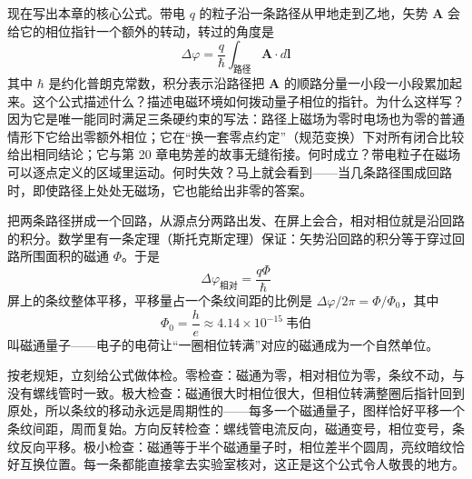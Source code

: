 \begin{mainline}
现在写出本章的核心公式。带电 \(q\) 的粒子沿一条路径从甲地走到乙地，矢势 \(\mathbf A\) 会给它的相位指针一个额外的转动，转过的角度是
\[
\Delta\varphi=\frac{q}{\hbar}\int_{\text{路径}}\mathbf A\cdot d\mathbf l
\]
其中 \(\hbar\) 是约化普朗克常数，积分表示沿路径把 \(\mathbf A\) 的顺路分量一小段一小段累加起来。这个公式描述什么？描述电磁环境如何拨动量子相位的指针。为什么这样写？因为它是唯一能同时满足三条硬约束的写法：路径上磁场为零时电场也为零的普通情形下它给出零额外相位；它在“换一套零点约定”（规范变换）下对所有闭合比较给出相同结论；它与第 20 章电势差的故事无缝衔接。何时成立？带电粒子在磁场可以逐点定义的区域里运动。何时失效？马上就会看到——当几条路径围成回路时，即使路径上处处无磁场，它也能给出非零的答案。

把两条路径拼成一个回路，从源点分两路出发、在屏上会合，相对相位就是沿回路的积分。数学里有一条定理（斯托克斯定理）保证：矢势沿回路的积分等于穿过回路所围面积的磁通 \(\Phi\)。于是
\[
\Delta\varphi_{\text{相对}}=\frac{q\Phi}{\hbar}
\]
屏上的条纹整体平移，平移量占一个条纹间距的比例是 \(\Delta\varphi/2\pi=\Phi/\Phi_0\)，其中
\[
\Phi_0=\frac{h}{e}\approx4.14\times10^{-15}\ \text{韦伯}
\]
叫磁通量子——电子的电荷让“一圈相位转满”对应的磁通成为一个自然单位。

按老规矩，立刻给公式做体检。零检查：磁通为零，相对相位为零，条纹不动，与没有螺线管时一致。极大检查：磁通很大时相位很大，但相位转满整圈后指针回到原处，所以条纹的移动永远是周期性的——每多一个磁通量子，图样恰好平移一个条纹间距，周而复始。方向反转检查：螺线管电流反向，磁通变号，相位变号，条纹反向平移。极小检查：磁通等于半个磁通量子时，相位差半个圆周，亮纹暗纹恰好互换位置。每一条都能直接拿去实验室核对，这正是这个公式令人敬畏的地方。
\end{mainline}

\begin{center}
\end{center}

